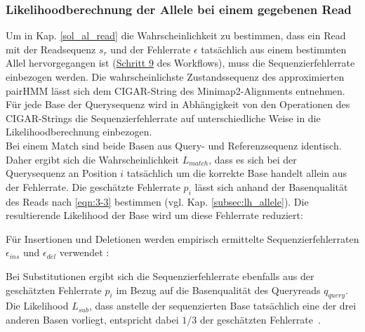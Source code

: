 \subsubsection{Likelihoodberechnung der Allele bei einem gegebenen Read} \label{pHMM_alleles}

Um in Kap. \ref{sol_al_read} die Wahrscheinlichkeit zu bestimmen, dass ein Read mit der Readsequenz $s_{r}$ und der Fehlerrate $\epsilon$ tatsächlich aus einem bestimmten Allel hervorgegangen ist (\hyperref[step9]{Schritt 9\label{step9txt}} des Workflows), muss die Sequenzierfehlerrate einbezogen werden. Die wahrscheinlichste Zustandssequenz des approximierten pairHMM lässt sich dem CIGAR-String des Minimap2-Alignments entnehmen. Für jede Base der Querysequenz wird in Abhängigkeit von den Operationen des CIGAR-Strings die Sequenzierfehlerrate auf unterschiedliche Weise in die Likelihoodberechnung einbezogen. \\

Bei einem Match sind beide Basen aus Query- und Referenzsequenz identisch. Daher ergibt sich die Wahrscheinlichkeit $L_{match}$, dass es sich bei der Querysequenz an Position $i$ tatsächlich um die korrekte Base handelt allein aus der Fehlerrate. Die geschätzte Fehlerrate $ p_{i} $ lässt sich anhand der Basenqualität des Reads nach \eqref{eqn:3-3} bestimmen (vgl. Kap. \ref{subsec:lh_allele}). Die resultierende Likelihood der Base wird um diese Fehlerrate reduziert:
\vspace{-0.5cm}
\begin{center}
\end{center}
Für Insertionen und Deletionen werden empirisch ermittelte Sequenzierfehlerraten $\epsilon_{ins}$ und $\epsilon_{del}$ verwendet \cite{schirmer_2016}: 
\vspace{-0.5cm}
\begin{center}
\end{center}

Bei Substitutionen ergibt sich die Sequenzierfehlerrate ebenfalls aus der geschätzten Fehlerrate $p_{i}$ im Bezug auf die Basenqualität des Queryreads $q_{query}$. Die Likelihood $L_{sub}$, dass anstelle der sequenzierten Base tatsächlich eine der drei anderen Basen vorliegt, entspricht dabei $ 1/3 $ der geschätzten Fehlerrate~\cite{kuhner_2014}.
\vspace{-0.5cm}
\begin{center}
\end{center}

